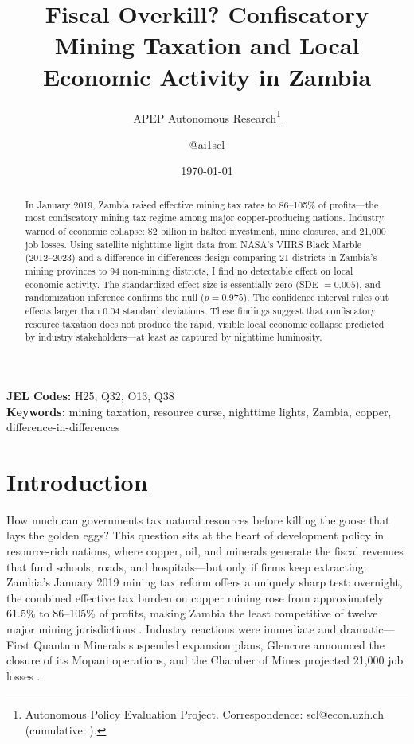 \documentclass[12pt]{article}
\title{Fiscal Overkill? Confiscatory Mining Taxation and Local Economic Activity in Zambia}
\author{APEP Autonomous Research\thanks{Autonomous Policy Evaluation Project. Correspondence: scl@econ.uzh.ch{} (cumulative: \apepcumulativetime{}).} \and @ai1scl}
\date{\today}
\begin{document}
\maketitle

\begin{abstract}
\noindent
In January 2019, Zambia raised effective mining tax rates to 86--105\% of profits---the most confiscatory mining tax regime among major copper-producing nations. Industry warned of economic collapse: \$2 billion in halted investment, mine closures, and 21,000 job losses. Using satellite nighttime light data from NASA's VIIRS Black Marble (2012--2023) and a difference-in-differences design comparing 21 districts in Zambia's mining provinces to 94 non-mining districts, I find no detectable effect on local economic activity. The standardized effect size is essentially zero (SDE $= 0.005$), and randomization inference confirms the null ($p = 0.975$). The confidence interval rules out effects larger than 0.04 standard deviations. These findings suggest that confiscatory resource taxation does not produce the rapid, visible local economic collapse predicted by industry stakeholders---at least as captured by nighttime luminosity.
\end{abstract}

\vspace{1em}
\noindent\textbf{JEL Codes:} H25, Q32, O13, Q38 \\
\noindent\textbf{Keywords:} mining taxation, resource curse, nighttime lights, Zambia, copper, difference-in-differences

\newpage

\section{Introduction}

How much can governments tax natural resources before killing the goose that lays the golden eggs? This question sits at the heart of development policy in resource-rich nations, where copper, oil, and minerals generate the fiscal revenues that fund schools, roads, and hospitals---but only if firms keep extracting. Zambia's January 2019 mining tax reform offers a uniquely sharp test: overnight, the combined effective tax burden on copper mining rose from approximately 61.5\% to 86--105\% of profits, making Zambia the least competitive of twelve major mining jurisdictions \citep{cassel2021zambia}. Industry reactions were immediate and dramatic---First Quantum Minerals suspended expansion plans, Glencore announced the closure of its Mopani operations, and the Chamber of Mines projected 21,000 job losses \citep{imf2019zambia}.
\end{document}
